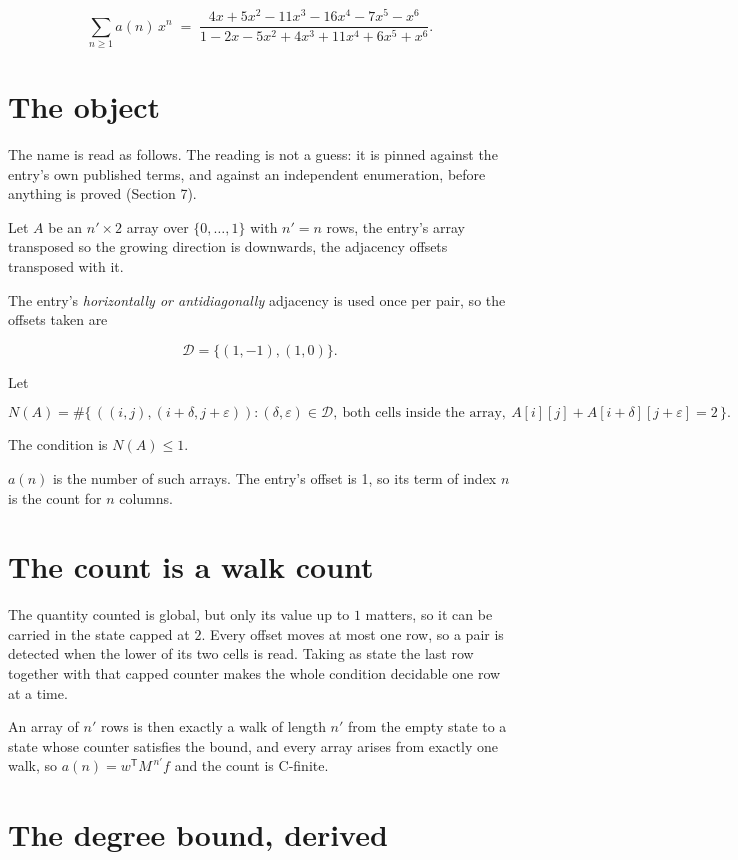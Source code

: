 \documentclass[11pt]{article}
\theoremstyle{definition}
\begin{document}
\[\sum_{n \ge 1} a(n)\,x^n \;=\; \frac{4x + 5x^{2} - 11x^{3} - 16x^{4} - 7x^{5} - x^{6}}{1 - 2x - 5x^{2} + 4x^{3} + 11x^{4} + 6x^{5} + x^{6}}.\]

\section{The object}

The name is read as follows. The reading is not a guess: it is pinned against the entry's own published terms, and against an independent enumeration, before anything is proved (Section 7).

Let $A$ be an $n' \times 2$ array over $\{0,\dots,1\}$ with $n' = n$ rows, the entry's array transposed so the growing direction is downwards, the adjacency offsets transposed with it.

The entry's {\itshape horizontally or antidiagonally} adjacency is used once per pair, so the offsets taken are

\[\mathcal{D} = \{(1,-1), (1,0)\}.\]

Let

\[N(A) = \#\bigl\{\,((i,j),(i{+}\delta,j{+}\varepsilon)) : (\delta,\varepsilon) \in \mathcal{D},\ \text{both cells inside the array},\ A[i][j] + A[i{+}\delta][j{+}\varepsilon] = 2\,\bigr\}.\]

The condition is $N(A) \le 1$.

$a(n)$ is the number of such arrays. The entry's offset is 1, so its term of index $n$ is the count for $n$ columns.

\section{The count is a walk count}

The quantity counted is global, but only its value up to $1$ matters, so it can be carried in the state capped at $2$. Every offset moves at most one row, so a pair is detected when the lower of its two cells is read. Taking as state the last row together with that capped counter makes the whole condition decidable one row at a time.

An array of $n'$ rows is then exactly a walk of length $n'$ from the empty state to a state whose counter satisfies the bound, and every array arises from exactly one walk, so $a(n) = w^{\mathsf T}M^{\,n'}f$ and the count is C-finite.

\section{The degree bound, derived}
\end{document}
